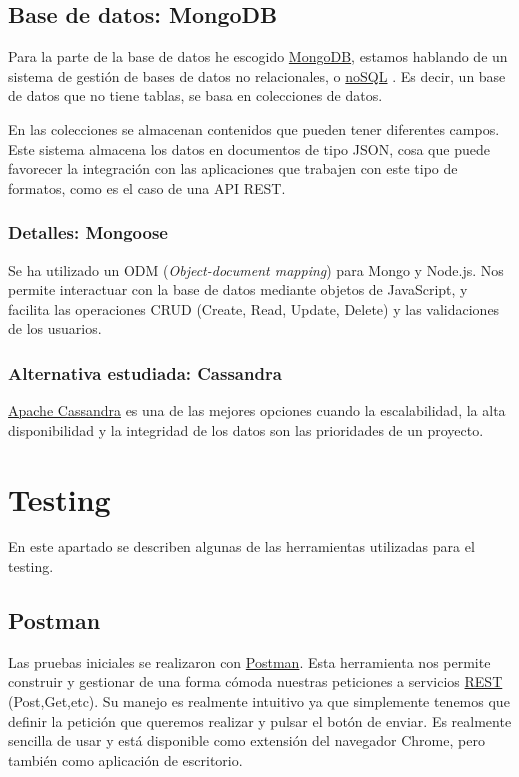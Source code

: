 \subsection{Base de datos: MongoDB}\label{tecnologias-mongodb}
Para la parte de la base de datos he escogido \hyperlink{https://www.mongodb.com/}{MongoDB}, estamos hablando de un sistema de gestión de bases de datos no relacionales, o \hyperlink{https://es.wikipedia.org/wiki/NoSQL}{noSQL} . Es decir, un base de datos que no tiene tablas, se basa en colecciones de datos.

En las colecciones se almacenan contenidos que pueden tener diferentes campos. Este sistema almacena los datos en documentos de tipo JSON, cosa que puede favorecer la integración con las aplicaciones que trabajen con este tipo de formatos, como es el caso de una API REST. 



\subsubsection{Detalles: Mongoose}\label{mongoose}
Se ha utilizado un ODM (\emph{Object-document mapping}) para Mongo y Node.js. Nos permite interactuar con la base de datos mediante objetos de JavaScript, y facilita las operaciones CRUD (Create, Read, Update, Delete) y las validaciones de los usuarios.

\subsubsection{Alternativa estudiada: Cassandra}\label{cassandra}
\hyperlink{https://www.cassandra.apache.org/}{Apache Cassandra} es una de las mejores opciones cuando la escalabilidad, la alta disponibilidad y la integridad de los datos son las prioridades de un proyecto.


\section{Testing}\label{testing}
En este apartado se describen algunas de las herramientas utilizadas para el testing.


\subsection{Postman}\label{postman}
Las pruebas iniciales se realizaron con  \hyperlink{https://www.getpostman.com}{Postman}. Esta herramienta nos permite construir y gestionar de una forma cómoda nuestras peticiones a servicios \hyperlink{https://es.wikipedia.org/wiki/Transferencia_de_Estado_Representacional}{REST} (Post,Get,etc). Su manejo es realmente intuitivo ya que simplemente tenemos que definir la petición que queremos realizar y pulsar el botón de enviar. Es realmente sencilla de usar y está disponible como extensión del navegador Chrome, pero también como aplicación de escritorio.

